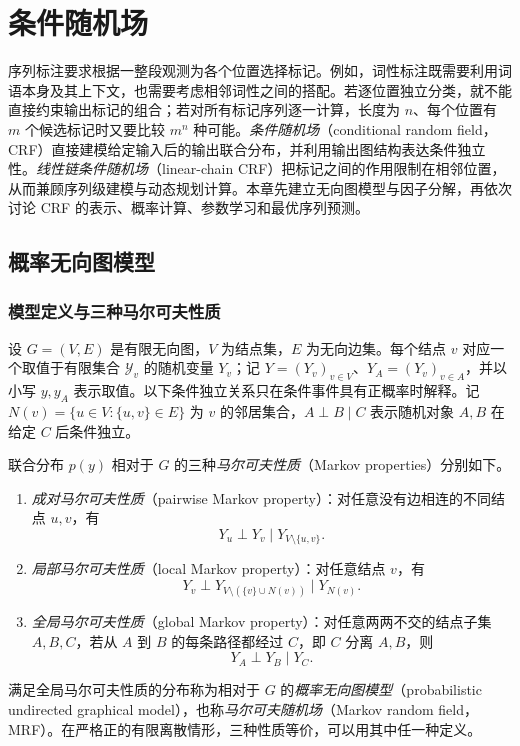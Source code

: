 \setcounter{chapter}{10} %
\chapter{条件随机场}
\label{chap:lihang-crf}


序列标注要求根据一整段观测为各个位置选择标记。例如，词性标注既需要利用词语本身及其上下文，也需要考虑相邻词性之间的搭配。若逐位置独立分类，就不能直接约束输出标记的组合；若对所有标记序列逐一计算，长度为 $n$、每个位置有 $m$ 个候选标记时又要比较 $m^n$ 种可能。\emph{条件随机场}（conditional random field，CRF）直接建模给定输入后的输出联合分布，并利用输出图结构表达条件独立性。\emph{线性链条件随机场}（linear-chain CRF）把标记之间的作用限制在相邻位置，从而兼顾序列级建模与动态规划计算。本章先建立无向图模型与因子分解，再依次讨论 CRF 的表示、概率计算、参数学习和最优序列预测。

\section{概率无向图模型}
\label{sec:lihang-crf-undirected}

\subsection{模型定义与三种马尔可夫性质}
\label{subsec:lihang-crf-markov}

设 $G=(V,E)$ 是有限无向图，$V$ 为结点集，$E$ 为无向边集。每个结点 $v$ 对应一个取值于有限集合 $\mathcal Y_v$ 的随机变量 $Y_v$；记 $Y=(Y_v)_{v\in V}$、$Y_A=(Y_v)_{v\in A}$，并以小写 $y,y_A$ 表示取值。以下条件独立关系只在条件事件具有正概率时解释。记 $N(v)=\{u\in V:\{u,v\}\in E\}$ 为 $v$ 的邻居集合，$A\perp B\mid C$ 表示随机对象 $A,B$ 在给定 $C$ 后条件独立。

\begin{definition}
\label{def:lihang-crf-markov-properties}
联合分布 $p(y)$ 相对于 $G$ 的三种\emph{马尔可夫性质}（Markov properties）分别如下。
\begin{enumerate}
  \item \emph{成对马尔可夫性质}（pairwise Markov property）：对任意没有边相连的不同结点 $u,v$，有
  \[
    Y_u\perp Y_v\mid Y_{V\setminus\{u,v\}}.
  \]
  \item \emph{局部马尔可夫性质}（local Markov property）：对任意结点 $v$，有
  \[
    Y_v\perp Y_{V\setminus(\{v\}\cup N(v))}\mid Y_{N(v)}.
  \]
  \item \emph{全局马尔可夫性质}（global Markov property）：对任意两两不交的结点子集 $A,B,C$，若从 $A$ 到 $B$ 的每条路径都经过 $C$，即 $C$ 分离 $A,B$，则
  \[
    Y_A\perp Y_B\mid Y_C.
  \]
\end{enumerate}
满足全局马尔可夫性质的分布称为相对于 $G$ 的\emph{概率无向图模型}（probabilistic undirected graphical model），也称\emph{马尔可夫随机场}（Markov random field，MRF）。在严格正的有限离散情形，三种性质等价，可以用其中任一种定义。
\end{definition}

